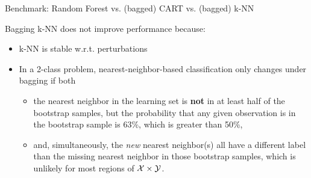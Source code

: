 \documentclass[11pt,compress,t,notes=noshow, xcolor=table]{beamer}
\begin{document}
\begin{vbframe}{Benchmark: Random Forest vs. (bagged) CART vs. (bagged) k-NN}

  Bagging k-NN does not improve performance because:

  \begin{itemize}
    \item k-NN is stable w.r.t. perturbations
    \item In a 2-class problem, nearest-neighbor-based classification only changes under bagging if both
    \begin{itemize}
    \item the nearest neighbor in the learning set is \textbf{not} in at least half of the bootstrap samples, but the probability that any given observation is in the bootstrap sample is 63\%, which is greater than 50\%,
    \item and, simultaneously, the \emph{new} nearest neighbor(s) all have a different label than the missing nearest neighbor in those bootstrap samples, which is unlikely for most regions of $\mathcal{X} \times \mathcal{Y}$.
    \end{itemize}
\end{itemize}
\end{vbframe}


\endlecture
\end{document}
